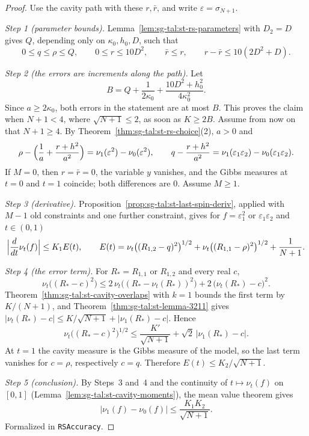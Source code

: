 \begin{proof}
  \leanok
Use the cavity path with these $r,\bar r$, and write $\varepsilon=\sigma_{N+1}$.

\emph{Step 1 (parameter bounds).} Lemma~\ref{lem:sg-tal:st-rs-parameters} with $D_2=D$ gives $Q$, depending only
on $\kappa_0,h_0,D$, such that
\[
0\le q\le\rho\le Q,\qquad0\le r\le10D^2,\qquad\bar r\le r,\qquad r-\bar r\le10(2D^2+D).
\]

\emph{Step 2 (the errors are increments along the path).} Let
\[
B=Q+\frac1{2\kappa_0}+\frac{10D^2+h_0^2}{4\kappa_0^2} .
\]
Since $a\ge2\kappa_0$, both errors in the statement are at most $B$. This proves the claim when $N+1<4$, where
$\sqrt{N+1}\le2$, as soon as $K\ge2B$. Assume from now on that $N+1\ge4$. By
Theorem~\ref{thm:sg-tal:st-rs-choice}(2), $a>0$ and
\[
\rho-\Bigl(\frac1a+\frac{r+h^2}{a^2}\Bigr)=\nu_1(\varepsilon^2)-\nu_0(\varepsilon^2),\qquad
q-\frac{r+h^2}{a^2}=\nu_1(\varepsilon_1\varepsilon_2)-\nu_0(\varepsilon_1\varepsilon_2).
\]
If $M=0$, then $r=\bar r=0$, the variable $y$ vanishes, and the Gibbs measures at $t=0$ and $t=1$ coincide;
both differences are $0$. Assume $M\ge1$.

\emph{Step 3 (derivative).} Proposition~\ref{prop:sg-tal:st-last-spin-deriv}, applied with $M-1$ old constraints
and one further constraint, gives for $f=\varepsilon_1^2$ or $\varepsilon_1\varepsilon_2$ and $t\in(0,1)$
\[
\Bigl|\frac d{dt}\nu_t(f)\Bigr|\le K_1E(t),\qquad
E(t)=\nu_t\bigl((R_{1,2}-q)^2\bigr)^{1/2}+\nu_t\bigl((R_{1,1}-\rho)^2\bigr)^{1/2}+\frac1{N+1}.
\]

\emph{Step 4 (the error term).} For $R_\ast=R_{1,1}$ or $R_{1,2}$ and every real $c$,
\[
\nu_t\bigl((R_\ast-c)^2\bigr)\le2\,\nu_t\bigl((R_\ast-\nu_t(R_\ast))^2\bigr)
+2\,\bigl(\nu_t(R_\ast)-c\bigr)^2 .
\]
Theorem~\ref{thm:sg-tal:st-cavity-overlaps} with $k=1$ bounds the first term by $K/(N+1)$, and
Theorem~\ref{thm:sg-tal:st-lemma-3211} gives $|\nu_t(R_\ast)-c|\le K/\sqrt{N+1}+|\nu_1(R_\ast)-c|$. Hence
\[
\nu_t\bigl((R_\ast-c)^2\bigr)^{1/2}\le\frac{K'}{\sqrt{N+1}}+\sqrt2\,\bigl|\nu_1(R_\ast)-c\bigr| .
\]
At $t=1$ the cavity measure is the Gibbs measure of the model, so the last term vanishes for $c=\rho$,
respectively $c=q$. Therefore $E(t)\le K_2/\sqrt{N+1}$.

\emph{Step 5 (conclusion).} By Steps~3 and~4 and the continuity of $t\mapsto\nu_t(f)$ on $[0,1]$
(Lemma~\ref{lem:sg-tal:st-cavity-moments}), the mean value theorem gives
\[
|\nu_1(f)-\nu_0(f)|\le\frac{K_1K_2}{\sqrt{N+1}} .
\]
Formalized in \texttt{RSAccuracy}.
\end{proof}

